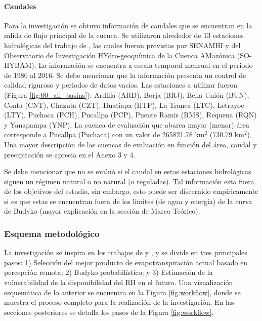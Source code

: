 \documentclass[12pt]{article}
\begin{document}
\paragraph{Caudales}\mbox{}

Para la investigación se obtuvo información de caudales que se encuentran en la salida de flujo principal de la cuenca. Se utilizaron alrededor de 13 estaciones hidrológicas del trabajo de \citet{Aybar2019}, las cuales fueron provistas por SENAMHI y del Observatorio de Investigación HYdro-geoquímica de la Cuenca AMazónica (SO-HYBAM). La información se encuentra a escala temporal mensual en el periodo de 1980 al 2016. Se debe mencionar que la información presenta un control de calidad riguroso y periodos de datos vacíos. Las estaciones a utilizar fueron (Figura \ref{fig:00_all_basins}): Ardilla (ARD), Borja (BRJ), Bella Unión (BUN), Conta (CNT), Chazuta (CZT), Huatiapa (HTP), La Tranca (LTC), Letrayoc (LTY), Puchaca (PCH), Pucallpa (PCP), Puente Ramis (RMS), Requena (RQN) y Yanapampa (YNP). La cuenca de evaluación que abarca mayor (menor) área corresponde a Pucallpa (Puchaca) con un valor de 265821.78 km$^{2}$ (730.79 km$^{2}$). Una mayor descripción de las cuencas de evaluación en función del área, caudal y precipitación se aprecia en el Anexo 3 y 4.

Se debe mencionar que no se evaluó si el caudal en estas estaciones hidrológicas siguen un régimen natural o no natural (o reguladas). Tal información esta fuera de los objetivos del estudio, sin embargo, esto puede ser discernido empíricamente si es que estas se encuentran fuera de los limites (de agua y energía) de la curva de Budyko (mayor explicación en la sección de Marco Teórico).

\clearpage

\thispagestyle{empty}
\clearpage

\thispagestyle{empty}
\clearpage

\subsubsection{Esquema metodológico}

La investigación se inspira en los trabajos de \citet{Weerasinghe2019discuss} y \citet{Singh2015}, y se divide en tres principales pasos: 1) Selección del mejor producto de evapotranspiración actual basado en percepción remota; 2) Budyko probabilístico; y 3) Estimación de la vulnerabilidad de la disponibilidad del RH en el futuro. Una visualización esquemática de lo anterior se encuentra en la Figura \ref{fig:workflow}, donde se muestra el proceso completo para la realización de la investigación. En las secciones posteriores se detalla los pasos de la Figura \ref{fig:workflow}.
\end{document}
